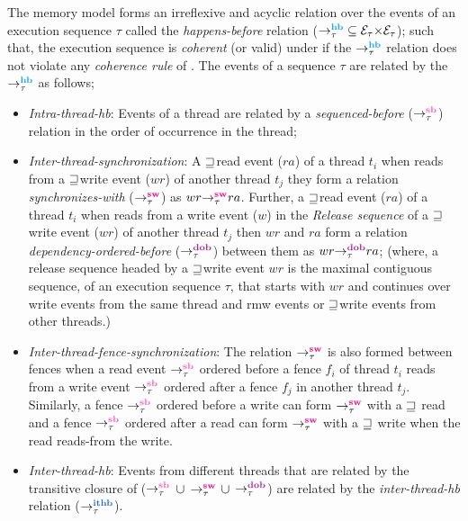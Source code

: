 The \cc memory model forms an irreflexive and acyclic relation over the events of 
an execution sequence $\tau$ called the {\em happens-before} relation 
($\setHB \subseteq \events_\tau {\times} \events_\tau$);
such that, the execution sequence is {\em coherent} (or valid) under \cc if 
the $\setHB$ relation does not violate any {\em coherence rule} of \cc.
%
The events of a sequence $\tau$ are related by the $\setHB$ as follows;
\begin{itemize}
	\item {\em Intra-thread-hb}: Events of a thread are related by a {\em sequenced-before}
	($\setSB$) relation in the order of occurrence in the thread;
	
	\item {\em Inter-thread-synchronization}: A ${\sqsupseteq}$\acq read event ($ra$) of a thread 
	$t_i$ when reads from a ${\sqsupseteq}$\rel write event ($wr$) of another thread $t_j$ they form a
	relation {\em synchronizes-with} ($\setSW$) as $\sw{\tau}{wr}{ra}$.
	Further, a ${\sqsupseteq}$\acq read event ($ra$) of a thread $t_i$ when reads from a write 
	event ($w$) in the {\em Release sequence} \cite{C11} of a ${\sqsupseteq}$\rel write event ($wr$) of 
	another thread $t_j$ then $wr$ and $ra$ form a relation {\em dependency-ordered-before}
	($\setDOB$) between them as $\dob{\tau}{wr}{ra}$;
	(where, a release sequence headed by a ${\sqsupseteq}$\rel write event $wr$ is the maximal 
	contiguous sequence, of an execution sequence $\tau$, that starts with $wr$ and continues 
	over write events from the same thread and rmw events or ${\sqsupseteq}$\rel write events from
	other threads.)
	
	\item {\em Inter-thread-fence-synchronization}: The relation $\setSW$ is also formed 
	between \cc fences when a read event $\setSB$ ordered before a fence $f_i$ of thread 
	$t_i$ reads from a write event $\setSB$ ordered after a fence $f_j$ in another thread
	$t_j$.
	Similarly, a fence $\setSB$ ordered before a write can form $\setSW$ with a ${\sqsupseteq}$\acq
	read and a fence $\setSB$ ordered after a read can form $\setSW$ with a ${\sqsupseteq}$\rel
	write when the read reads-from the write.
	
	\item {\em Inter-thread-hb}: Events from different threads that are related by the 
	transitive closure of ($\setSB$ $\cup$ $\setSW$ $\cup$ $\setDOB$) are related by 
	the {\em inter-thread-hb} relation ($\setITHB$). 
\end{itemize}

